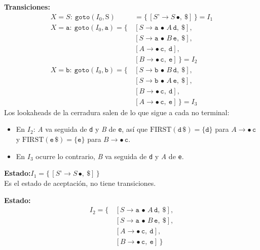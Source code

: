 \documentclass[12pt,letterpaper]{article}
\newcommand{\nt}[1]{\textit{#1}}
\newcommand{\tk}[1]{\texttt{#1}}
\newcommand{\tx}[1]{\text{#1}}
\newcommand{\First}[1]{\mathrm{FIRST}(#1)}
\begin{document}
\begin{enumerate}[label=\arabic*.]
  \textbf{Transiciones:}
  \[
  \begin{aligned}
    X=\nt{S}:\ \texttt{goto}(I_0,\tx{S}) &= \{\,[\nt{S'}\to\nt{S}\,\bullet,\ \tk{\$}]\,\} = \boxed{I_1}\\[6pt]
    X=\tk{a}:\ \texttt{goto}(I_0,\tk{a}) = \{\, & [\nt{S}\to\tk{a}\,\bullet\,\nt{A}\,\tk{d},\ \tk{\$}],\\
                                                & [\nt{S}\to\tk{a}\,\bullet\,\nt{B}\,\tk{e},\ \tk{\$}],\\
                                                & [\nt{A}\to\bullet\,\tk{c},\ \tk{d}],\\
                                                & [\nt{B}\to\bullet\,\tk{c},\ \tk{e}]\,\} = \boxed{I_2}\\[6pt]
    X=\tk{b}:\ \texttt{goto}(I_0,\tk{b}) = \{\, & [\nt{S}\to\tk{b}\,\bullet\,\nt{B}\,\tk{d},\ \tk{\$}],\\
                                                & [\nt{S}\to\tk{b}\,\bullet\,\nt{A}\,\tk{e},\ \tk{\$}],\\
                                                & [\nt{B}\to\bullet\,\tk{c},\ \tk{d}],\\
                                                & [\nt{A}\to\bullet\,\tk{c},\ \tk{e}]\,\} = \boxed{I_3}
  \end{aligned}
  \]
  Los lookaheads de la cerradura salen de lo que sigue a cada no terminal:
  \begin{itemize}
  \item En $I_2$: \nt{A} va seguida de \tk{d} y \nt{B} de \tk{e}, así que $\First{\tk{d}\,\tk{\$}}=\{\tk{d}\}$ para
    $\nt{A}\to\bullet\,\tk{c}$ y $\First{\tk{e}\,\tk{\$}}=\{\tk{e}\}$ para $\nt{B}\to\bullet\,\tk{c}$.
  \item En $I_3$ ocurre lo contrario, \nt{B} va seguida de \tk{d} y \nt{A} de \tk{e}.
  \end{itemize}

  \medskip

  \textbf{Estado:}\quad $I_1 = \{\,[\nt{S'}\to\nt{S}\,\bullet,\ \tk{\$}]\,\}$\\
  Es el estado de aceptación, no tiene transiciones.

  \medskip

  \textbf{Estado:}
  \[
  \begin{aligned}
      I_2 = \{\, & [\nt{S}\to\tk{a}\,\bullet\,\nt{A}\,\tk{d},\ \tk{\$}],\\
             & [\nt{S}\to\tk{a}\,\bullet\,\nt{B}\,\tk{e},\ \tk{\$}],\\
             & [\nt{A}\to\bullet\,\tk{c},\ \tk{d}],\\
             & [\nt{B}\to\bullet\,\tk{c},\ \tk{e}]\,\}
  \end{aligned}
  \]


\end{enumerate}
\end{document}
